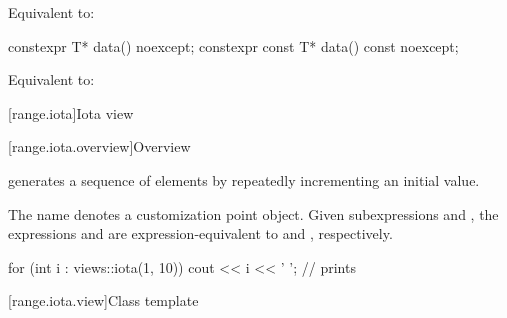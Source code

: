 \begin{itemdescr}
\pnum
\effects
Equivalent to: 
\end{itemdescr}

%
\begin{itemdecl}
constexpr T* data() noexcept;
constexpr const T* data() const noexcept;
\end{itemdecl}

\begin{itemdescr}
\pnum
\effects
Equivalent to: 
\end{itemdescr}

[range.iota]{Iota view}

[range.iota.overview]{Overview}

\pnum
{} generates a
sequence of elements by repeatedly incrementing an initial value.

\pnum
{}%
The name  denotes a
customization point object.
Given subexpressions  and , the expressions
 and 
are expression-equivalent to
 and , respectively.

\pnum
\begin{example}
\begin{codeblock}
for (int i : views::iota(1, 10))
  cout << i << ' '; // prints 
\end{codeblock}
\end{example}

[range.iota.view]{Class template }

